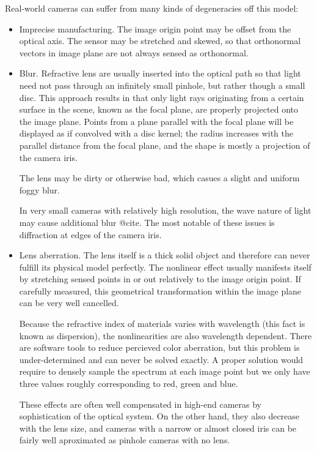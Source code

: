 Real-world cameras can suffer from many kinds of degeneracies off this model:
\begin{itemize}

\item
Imprecise manufacturing.
The image origin point may be offset from the optical axis.
The sensor may be stretched and skewed, so that orthonormal vectors in image plane are not always sensed as orthonormal.

\item
Blur.
Refractive lens are usually inserted into the optical path so that light need not pass through an infinitely small pinhole, but rather though a small disc.
This approach results in that only light rays originating from a certain surface in the scene, known as the focal plane, are properly projected onto the image plane.
Points from a plane parallel with the focal plane will be displayed as if convolved with a disc kernel; the radius increases with the parallel distance from the focal plane, and the shape is mostly a projection of the camera iris.

The lens may be dirty or otherwise bad, which casues a slight and uniform foggy blur.

In very small cameras with relatively high resolution, the wave nature of light may cause additional blur @cite.
The most notable of these issues is diffraction at edges of the camera iris.

\item
Lens aberration.
The lens itself is a thick solid object and therefore can never fulfill its physical model perfectly.
The nonlinear effect usually manifests itself by stretching sensed points in or out relatively to the image origin point.
If carefully measured, this geometrical transformation within the image plane can be very well cancelled.

Because the refractive index of materials varies with wavelength (this fact is known as dispersion), the nonlinearities are also wavelength dependent.
There are software tools to reduce percieved color aberration, but this problem is under-determined and can never be solved exactly.
A proper solution would require to densely sample the spectrum at each image point but we only have three values roughly corresponding to red, green and blue.

These effects are often well compensated in high-end cameras by sophistication of the optical system.
On the other hand, they also decrease with the lens size, and cameras with a narrow or almost closed iris can be fairly well aproximated as pinhole cameras with no lens.


\end{itemize}
